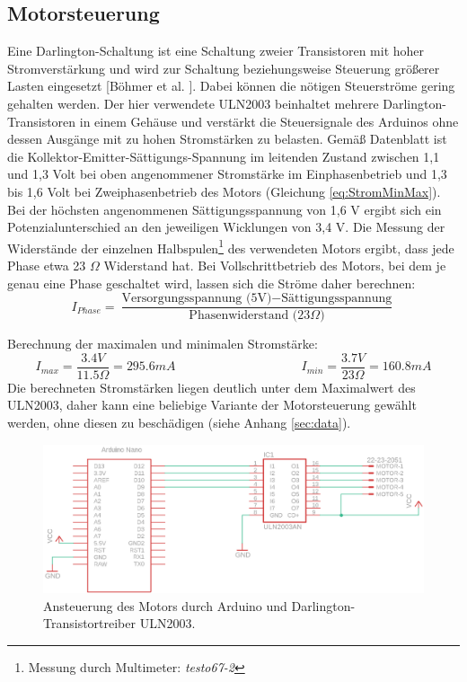 \documentclass[11pt, titlepage]{report}
\begin{document}
			\subsection{Motorsteuerung}
			\label{sec:Motorsteuerung}
				Eine Darlington-Schaltung ist eine Schaltung zweier Transistoren mit hoher Stromverstärkung und wird zur Schaltung beziehungsweise Steuerung größerer Lasten eingesetzt [Böhmer et al. \cite[S.290]{Darlington}]. Dabei können die nötigen Steuerströme gering gehalten werden. 
				\newline Der hier verwendete ULN2003 beinhaltet mehrere Darlington-Transistoren in einem Gehäuse und verstärkt die Steuersignale des Arduinos ohne dessen Ausgänge mit zu hohen Stromstärken zu belasten. Gemäß Datenblatt ist die Kollektor-Emitter-Sättigungs-Spannung im leitenden Zustand zwischen 1,1 und 1,3 Volt bei oben angenommener Stromstärke im Einphasenbetrieb und 1,3 bis 1,6 Volt bei Zweiphasenbetrieb des Motors (Gleichung \ref{eq:StromMinMax}). Bei der höchsten angenommenen Sättigungsspannung von 1,6 V ergibt sich ein Potenzialunterschied an den jeweiligen Wicklungen von 3,4 V.
				Die Messung der Widerstände der einzelnen Halbspulen\footnote{Messung durch Multimeter: \textit{testo67-2}} des verwendeten Motors ergibt, dass jede Phase etwa 23 $\Omega$ Widerstand hat. Bei Vollschrittbetrieb des Motors, bei dem je genau eine Phase geschaltet wird, lassen sich die Ströme daher berechnen:
				\begin{equation}
					I_{Phase}=\frac{\text{Versorgungsspannung (5V)} - \text{Sättigungsspannung}}{\text{Phasenwiderstand (23$\Omega$)}}
				\end{equation}


				\vspace{3em}
				Berechnung der maximalen und minimalen Stromstärke:
				\begin{equation}
					I_{max}=\frac{3.4 V}{11.5 \Omega}=295.6 mA \hspace{10em}
					I_{min}=\frac{3.7 V}{23 \Omega}=160.8 mA
				\end{equation}
				\newline
				Die berechneten Stromstärken liegen deutlich unter dem Maximalwert des ULN2003, daher kann eine beliebige Variante der Motorsteuerung gewählt werden, ohne diesen zu beschädigen (siehe Anhang \ref{sec:data}). 
				\begin{figure}[htbp]
					\centering
					\includegraphics[width=\linewidth]{./img/Motorsteuerung.png}
					\caption{ Ansteuerung des Motors durch Arduino und  Darlington-Transistortreiber ULN2003.
					\label{fig:imgMotorsteuerung}}
				\end{figure}
			\newpage
\end{document}
